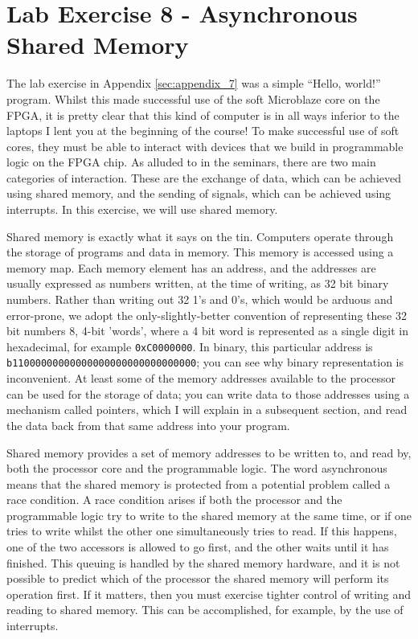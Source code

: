\documentclass[../physical_computing.tex]{subfiles}
\begin{document}
\chapter{Lab Exercise 8 - Asynchronous Shared Memory}
\label{sec:appendix_8}

The lab exercise in Appendix \ref{sec:appendix_7} was a simple ``Hello, world!'' program. Whilst this made successful use of the soft Microblaze core on the FPGA, it is pretty clear that this kind of computer is in all ways inferior to the laptops I lent you at the beginning of the course! To make successful use of soft cores, they must be able to interact with devices that we build in programmable logic on the FPGA chip. As alluded to in the seminars, there are two main categories of interaction. These are the exchange of data, which can be achieved using shared memory, and the sending of signals, which can be achieved using interrupts. In this exercise, we will use shared memory. 

Shared memory is exactly what it says on the tin. Computers operate through the storage of programs and data in memory. This memory is accessed using a memory map. Each memory element has an address, and the addresses are usually expressed as numbers written, at the time of writing, as 32 bit binary numbers. Rather than writing out 32 1's and 0's, which would be arduous and error-prone, we adopt the only-slightly-better convention of representing these 32 bit numbers 8, 4-bit 'words', where a 4 bit word is represented as a single digit in hexadecimal, for example \texttt{0xC0000000}. In binary, this particular address is \texttt{b11000000000000000000000000000000}; you can see why binary representation is inconvenient. At least some of the memory addresses available to the processor can be used for the storage of data; you can write data to those addresses using a mechanism called pointers, which I will explain in a subsequent section, and read the data back from that same address into your program.

Shared memory provides a set of memory addresses to be written to, and read by, both the processor core and the programmable logic. The word asynchronous means that the shared memory is protected from a potential problem called a race condition. A race condition arises if both the processor and the programmable logic try to write to the shared memory at the same time, or if one tries to write whilst the other one simultaneously tries to read. If this happens, one of the two accessors is allowed to go first, and the other waits until it has finished. This queuing is handled by the shared memory hardware, and it is not possible to predict which of the processor the shared memory will perform its operation first. If it matters, then you must exercise tighter control of writing and reading to shared memory. This can be accomplished, for example, by the use of interrupts.
\end{document}
